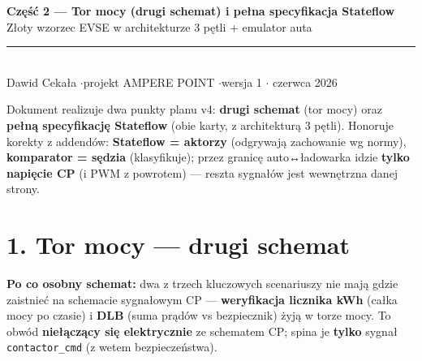 \documentclass[11pt]{article}
\newcommand{\key}[1]{\textbf{\color{navy}#1}}
\newcommand{\tc}[1]{\texttt{\small #1}}
\begin{document}
{\sffamily\bfseries\color{navy}\LARGE Część 2 --- Tor mocy (drugi schemat) i pełna specyfikacja Stateflow}\\[3pt]
{\sffamily\large\color{navy} Złoty wzorzec EVSE w architekturze 3 pętli + emulator auta}\\[5pt]
{\color{rulegrey}\rule{\linewidth}{1pt}}\\[3pt]
{\sffamily\small Dawid Cekała \quad$\cdot$\quad projekt AMPERE POINT \quad$\cdot$\quad wersja 1 \quad$\cdot$ czerwca 2026}

\vspace{0.5em}

Dokument realizuje dwa punkty planu v4: \key{drugi schemat} (tor mocy) oraz \key{pełną specyfikację Stateflow} (obie karty, z architekturą 3 pętli). Honoruje korekty z addendów: \key{Stateflow = aktorzy} (odgrywają zachowanie wg normy), \key{komparator = sędzia} (klasyfikuje); przez granicę auto↔ładowarka idzie \key{tylko napięcie CP} (i PWM z powrotem) --- reszta sygnałów jest wewnętrzna danej strony.

\section{1. Tor mocy --- drugi schemat}

\key{Po co osobny schemat:} dwa z trzech kluczowych scenariuszy nie mają gdzie zaistnieć na schemacie sygnałowym CP --- \key{weryfikacja licznika kWh} (całka mocy po czasie) i \key{DLB} (suma prądów vs bezpiecznik) żyją w torze mocy. To obwód \key{niełączący się elektrycznie} ze schematem CP; spina je \key{tylko} sygnał \tc{contactor\_cmd} (z wetem bezpieczeństwa).
\end{document}
